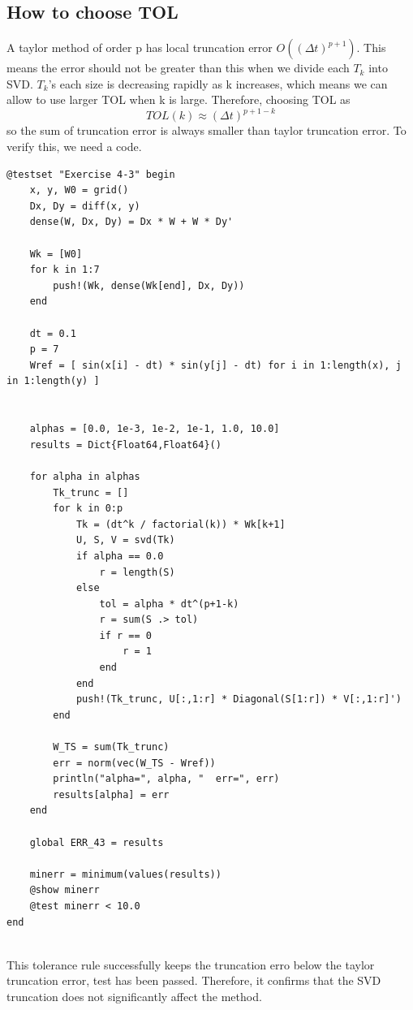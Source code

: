 \documentclass[11pt]{report}
\begin{document}
\subsection{How to choose TOL}

A taylor method of order p has local truncation error $O((\Delta t)^{p+1})$. This means the error should not be greater than this when we divide each $T_k$ into SVD. $T_k$'s each size is decreasing rapidly as k increases, which means we can allow to use larger TOL when k is large. Therefore, choosing TOL as 
\[
TOL(k) \approx (\Delta t)^{p+1-k}
\]
so the sum of truncation error is always smaller than taylor truncation error. 
To verify this, we need a code.

\begin{lstlisting}
@testset "Exercise 4-3" begin
    x, y, W0 = grid()
    Dx, Dy = diff(x, y)
    dense(W, Dx, Dy) = Dx * W + W * Dy'

    Wk = [W0]
    for k in 1:7
        push!(Wk, dense(Wk[end], Dx, Dy))
    end

    dt = 0.1
    p = 7
    Wref = [ sin(x[i] - dt) * sin(y[j] - dt) for i in 1:length(x), j in 1:length(y) ]


    alphas = [0.0, 1e-3, 1e-2, 1e-1, 1.0, 10.0]
    results = Dict{Float64,Float64}()

    for alpha in alphas
        Tk_trunc = []
        for k in 0:p
            Tk = (dt^k / factorial(k)) * Wk[k+1]
            U, S, V = svd(Tk)
            if alpha == 0.0
                r = length(S)
            else
                tol = alpha * dt^(p+1-k)
                r = sum(S .> tol)
                if r == 0
                    r = 1
                end
            end
            push!(Tk_trunc, U[:,1:r] * Diagonal(S[1:r]) * V[:,1:r]')
        end

        W_TS = sum(Tk_trunc)
        err = norm(vec(W_TS - Wref))
        println("alpha=", alpha, "  err=", err)
        results[alpha] = err
    end

    global ERR_43 = results
    
    minerr = minimum(values(results))
    @show minerr
    @test minerr < 10.0
end
  
\end{lstlisting}
This tolerance rule successfully keeps the truncation erro below the taylor truncation error, test has been passed. Therefore, it confirms that the SVD truncation does not significantly affect the method.
\end{document}
